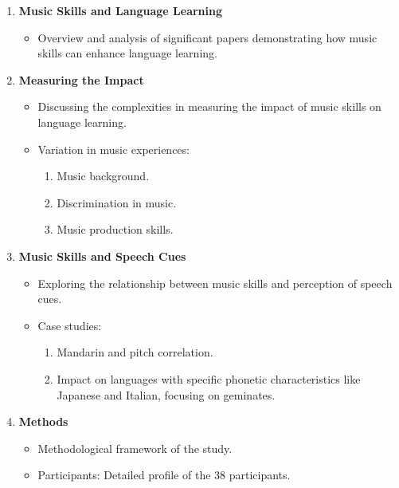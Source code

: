 \begin{enumerate}
    \item \textbf{Music Skills and Language Learning}
    \begin{itemize}
        \item Overview and analysis of significant papers demonstrating how music skills can enhance language learning.
    \end{itemize}
    
    \item \textbf{Measuring the Impact}
    \begin{itemize}
        \item Discussing the complexities in measuring the impact of music skills on language learning.
        \item Variation in music experiences:
        \begin{enumerate}
            \item Music background.
            \item Discrimination in music.
            \item Music production skills.
        \end{enumerate}
    \end{itemize}
    
    \item \textbf{Music Skills and Speech Cues}
    \begin{itemize}
        \item Exploring the relationship between music skills and perception of speech cues.
        \item Case studies:
        \begin{enumerate}
            \item Mandarin and pitch correlation.
            \item Impact on languages with specific phonetic characteristics like Japanese and Italian, focusing on geminates.
        \end{enumerate}
    \end{itemize}
    
    \item \textbf{Methods}
    \begin{itemize}
        \item Methodological framework of the study.
        \item Participants: Detailed profile of the 38 participants.
    \end{itemize}
    

\end{enumerate}
